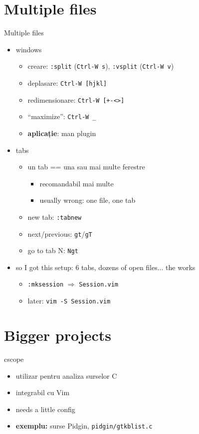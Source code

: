 \documentclass{beamer}
\begin{document}
\section{Multiple files}
\begin{frame}{Multiple files}
  \begin{itemize}
    \item windows
      \begin{itemize}
        \item creare: \texttt{:split} (\texttt{Ctrl-W s}), \texttt{:vsplit}
        (\texttt{Ctrl-W v})
        \item deplasare: \texttt{Ctrl-W [hjkl]}
        \item redimensionare: \texttt{Ctrl-W [+-<>]}
        \item ``maximize'': \texttt{Ctrl-W \_}
        \pause
        \item \textbf{aplicație}: man plugin
        \pause
      \end{itemize}
    \item tabs
      \begin{itemize}
        \item un tab == una sau mai multe ferestre
        \pause
        \begin{itemize}
          \item recomandabil mai multe
          \item usually wrong: one file, one tab
        \end{itemize}
        \pause
        \item new tab: \texttt{:tabnew}
        \item next/previous: \texttt{gt}/\texttt{gT}
        \item go to tab N: \texttt{Ngt}
      \end{itemize}
    \pause
    \item so I got this setup: 6 tabs, dozens of open files... the works
      \begin{itemize}
        \item \texttt{:mksession} $\Rightarrow$ \texttt{Session.vim}
        \item later: \texttt{vim -S Session.vim}
      \end{itemize}

  \end{itemize}
\end{frame}

\section{Bigger projects}
\begin{frame}{cscope}
  \begin{itemize}
    \item utilizar pentru analiza surselor C
    \item integrabil cu Vim
    \item needs a little config
    \pause
    \item \textbf{exemplu:} surse Pidgin, \texttt{pidgin/gtkblist.c}
  \end{itemize}
\end{frame}
\end{document}
